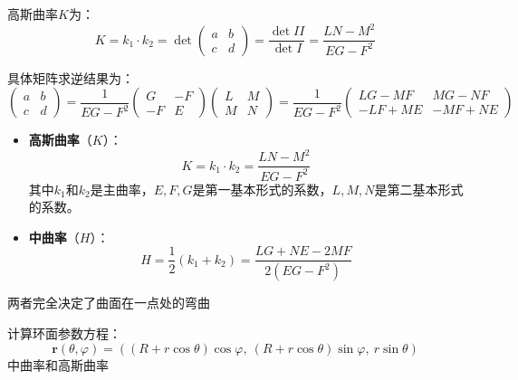 \documentclass[lang=cn,10pt,thmcnt=section]{elegantbook}
\begin{document}
        高斯曲率$K$为：
        \[
        K = k_1 \cdot k_2 = \det \begin{pmatrix} a & b \\ c & d \end{pmatrix} 
        = \frac{\det II}{\det I} 
        = \frac{LN - M^2}{EG - F^2}
        \]
        
        具体矩阵求逆结果为：
        \[
        \begin{pmatrix} a & b \\ c & d \end{pmatrix}
        = \frac{1}{EG - F^2}
        \begin{pmatrix}
        G & -F \\
        -F & E 
        \end{pmatrix}
        \begin{pmatrix}
        L & M \\
        M & N 
        \end{pmatrix}
        = \frac{1}{EG - F^2}
        \begin{pmatrix}
        LG - MF & MG - NF \\
        -LF + ME & -MF + NE 
        \end{pmatrix}
        \]
\begin{definition}[中曲率和高斯曲率]
    \begin{itemize}
        \item \textbf{高斯曲率}（$K$）：
        \[
        K = k_1 \cdot k_2 = \frac{LN - M^2}{EG - F^2}
        \]
        其中$k_1$和$k_2$是主曲率，$E,F,G$是第一基本形式的系数，$L,M,N$是第二基本形式的系数。
    
        \item \textbf{中曲率}（$H$）：
        \[
        H = \frac{1}{2}(k_1 + k_2) = \frac{LG + NE - 2MF}{2(EG - F^2)}
        \]
    \end{itemize}

    两者完全决定了曲面在一点处的弯曲
\end{definition}
\begin{example}
计算环面参数方程：
\[
\bm{r}(\theta, \varphi) = \left( (R + r \cos\theta) \cos\varphi,\ (R + r \cos\theta) \sin\varphi,\ r \sin\theta \right)
\]中曲率和高斯曲率
\end{example}
\end{document}
